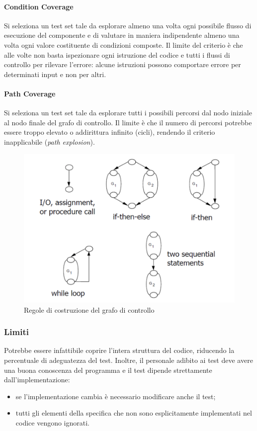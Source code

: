\paragraph{Condition Coverage} Si seleziona un test set tale da esplorare almeno una volta ogni possibile flusso di esecuzione del componente e di valutare in maniera indipendente almeno una volta ogni valore costituente di condizioni composte. Il limite del criterio è che alle volte non basta ispezionare ogni istruzione del codice e tutti i flussi di controllo per rilevare l'errore: alcune istruzioni possono comportare errore per determinati input e non per altri.
   
\paragraph{Path Coverage} Si seleziona un test set tale da esplorare tutti i possibili percorsi dal nodo iniziale al nodo finale del grafo di controllo. Il limite è che il numero di percorsi potrebbe essere troppo elevato o addirittura infinito (cicli), rendendo il criterio inapplicabile (\textit{path explosion}).

\begin{figure}[H]
    \centering
    \includegraphics[width=0.75\linewidth]{assets/wb-control-graph.png}
    \caption{Regole di costruzione del grafo di controllo}
    \label{fig:wb-graph}
\end{figure}

\subsubsection{Limiti}
Potrebbe essere infattibile coprire l'intera struttura del codice, riducendo la percentuale di adeguatezza del test. Inoltre, il personale adibito ai test deve avere una buona conoscenza del programma e il test dipende strettamente dall'implementazione:
\begin{itemize}
    \item se l'implementazione cambia è necessario modificare anche il test; 
    \item tutti gli elementi della specifica che non sono esplicitamente implementati nel codice vengono ignorati. 
\end{itemize}

